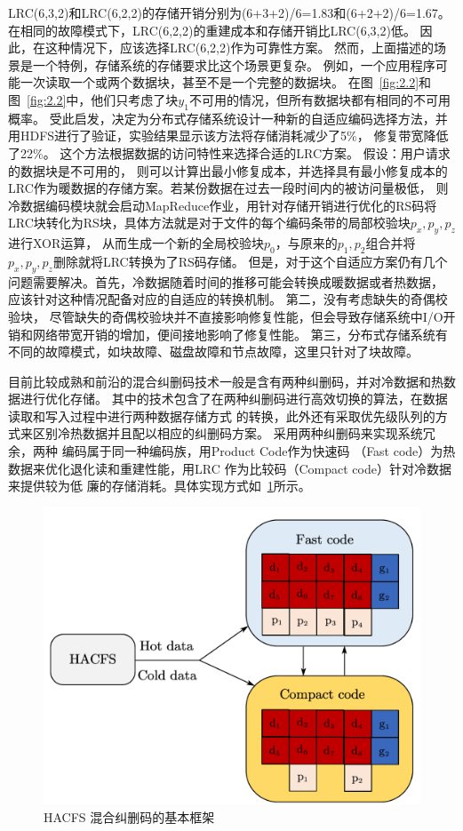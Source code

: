 LRC(6,3,2)和LRC(6,2,2)的存储开销分别为(6+3+2)/6=1.83和(6+2+2)/6=1.67。
在相同的故障模式下，LRC(6,2,2)的重建成本和存储开销比LRC(6,3,2)低。
因此，在这种情况下，应该选择LRC(6,2,2)作为可靠性方案。
然而，上面描述的场景是一个特例，存储系统的存储要求比这个场景更复杂。
例如，一个应用程序可能一次读取一个或两个数据块，甚至不是一个完整的数据块。
在图~\ref{fig:2.2}和图~\ref{fig:2.2}中，他们只考虑了块$y_1$不可用的情况，但所有数据块都有相同的不可用概率。
受此启发，\citet{wei2018new}决定为分布式存储系统设计一种新的自适应编码选择方法，并用HDFS进行了验证，实验结果显示该方法将存储消耗减少了5\%，
修复带宽降低了22\%。
这个方法根据数据的访问特性来选择合适的LRC方案。
假设：用户请求的数据块是不可用的，
则可以计算出最小修复成本，并选择具有最小修复成本的LRC作为暖数据的存储方案。若某份数据在过去一段时间内的被访问量极低，
则冷数据编码模块就会启动MapReduce作业，用针对存储开销进行优化的RS码将LRC块转化为RS块，具体方法就是对于文件的每个编码条带的局部校验块$p_x,p_y,p_z$进行XOR运算，
从而生成一个新的全局校验块$p_0$，与原来的$p_1,p_2$组合并将$p_x,p_y,p_z$删除就将LRC转换为了RS码存储。
但是，对于这个自适应方案仍有几个问题需要解决。首先，冷数据随着时间的推移可能会转换成暖数据或者热数据，
应该针对这种情况配备对应的自适应的转换机制。
第二，没有考虑缺失的奇偶校验块，
尽管缺失的奇偶校验块并不直接影响修复性能，但会导致存储系统中I/O开销和网络带宽开销的增加，便间接地影响了修复性能。
第三，分布式存储系统有不同的故障模式，如块故障、磁盘故障和节点故障，这里只针对了块故障。


目前比较成熟和前沿的混合纠删码技术一般是含有两种纠删码，并对冷数据和热数据进行优化存储。
其中的技术包含了在两种纠删码进行高效切换的算法，在数据读取和写入过程中进行两种数据存储方式
的转换，此外还有采取优先级队列的方式来区别冷热数据并且配以相应的纠删码方案。
\citet{xia2015tale}采用两种纠删码来实现系统冗余，两种
编码属于同一种编码族，用Product Code作为快速码
（Fast code）为热数据来优化退化读和重建性能，用LRC
作为比较码（Compact code）针对冷数据来提供较为低
廉的存储消耗。具体实现方式如~\ref{fig:con-2.6}所示。


\begin{figure}[htbp]
	\centering
	\includegraphics [scale=0.5]{figures/2.6.pdf}
	\caption{HACFS 混合纠删码的基本框架}
	\label{fig:con-2.6}
\end{figure}

